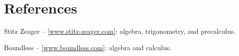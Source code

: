 \documentclass{tufte-book} %
\begin{document}
\section*{References}

Stitz Zeager -- [\url{www.stitz-zeager.com}]: algebra, trigonometry, and precalculus.

Boundless -- [\url{www.boundless.com}]: algebra and calculus.


\backmatter

\printindex %
\end{document}
